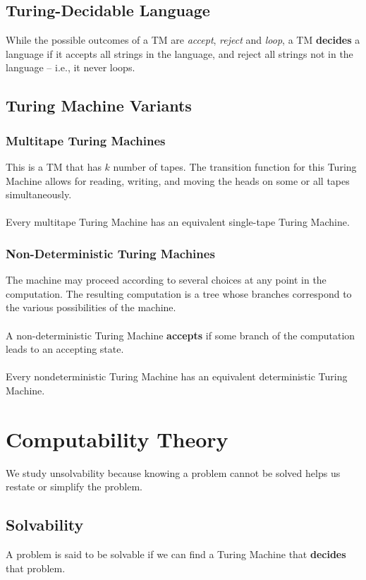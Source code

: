 \documentclass{article}
\begin{document}
\subsection{Turing-Decidable Language}
While the possible outcomes of a TM are \textit{accept}, \textit{reject} and \textit{loop}, a TM \textbf{decides} a language if it accepts all strings in the language, and reject all strings not in the language -- i.e., it never loops.

\subsection{Turing Machine Variants}
\subsubsection{Multitape Turing Machines}
This is a TM that has $k$ number of tapes. The transition function for this Turing Machine allows for reading, writing, and moving the heads on some or all tapes simultaneously. \\ \\
Every multitape Turing Machine has an equivalent single-tape Turing Machine.

\subsubsection{Non-Deterministic Turing Machines}
The machine may proceed according to several choices at any point in the computation. The resulting computation is a tree whose branches correspond to the various possibilities of the machine. \\ \\
A non-deterministic Turing Machine \textbf{accepts} if some branch of the computation leads to an accepting state. \\ \\
Every nondeterministic Turing Machine has an equivalent deterministic Turing Machine.

\section{Computability Theory}
We study unsolvability because knowing a problem cannot be solved helps us restate or simplify the problem.

\subsection{Solvability}
A problem is said to be solvable if we can find a Turing Machine that \textbf{decides} that problem.
\end{document}
